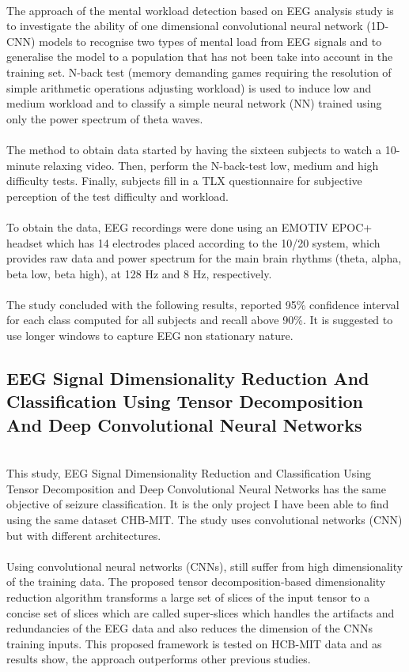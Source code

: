 \leavevmode\\
The approach of the mental workload detection based on EEG analysis study is to investigate the ability of one dimensional convolutional neural network (1D-CNN)\cite{CNN} models to recognise two types of mental load from EEG signals and to generalise the model to a population that has not been take into account in the training set. N-back test (memory demanding games requiring the resolution of simple arithmetic operations adjusting workload) is used to induce low and medium workload and to classify a simple neural network (NN) trained using only the power spectrum of theta waves.
\\\\
The method to obtain data started by having the sixteen subjects to watch a 10-minute relaxing video. Then, perform the N-back-test low, medium and high difficulty tests. Finally, subjects fill in a TLX questionnaire for subjective perception of the test difficulty and workload.
\\\\
To obtain the data, EEG recordings were done using an EMOTIV EPOC+ headset which has 14 electrodes placed according to the 10/20 system, which provides raw data and power spectrum for the main brain rhythms (theta, alpha, beta low, beta high), at 128 Hz and 8 Hz, respectively. 
\\\\
The study concluded with the following results, reported 95\% confidence interval for each class computed for all subjects and recall above 90\%. It is suggested to use longer windows to capture EEG non stationary nature.
\\


\subsection{EEG Signal Dimensionality Reduction And Classification Using Tensor Decomposition And Deep Convolutional Neural Networks}
\leavevmode\\
This study, EEG Signal Dimensionality Reduction and Classification Using Tensor Decomposition and Deep Convolutional Neural Networks\cite{relatedwork1} has the same objective of seizure classification. It is the only project I have been able to find using the same dataset CHB-MIT. The study uses convolutional networks (CNN) but with different architectures.
\\\\
Using convolutional neural networks (CNNs), still suffer from high dimensionality of the training data. The proposed tensor decomposition-based dimensionality reduction algorithm transforms a large set of slices of the input tensor to a concise set of slices which are called super-slices which handles the artifacts and redundancies of the EEG data and also reduces the dimension of the CNNs training inputs. This proposed framework is tested on HCB-MIT data and as results show, the approach outperforms other previous studies.
\\


